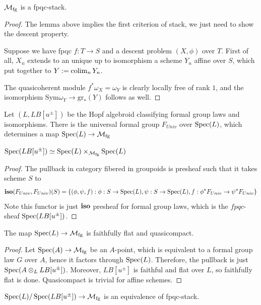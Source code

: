 \begin{proposition}
    $\mathcal{M}_{\mathrm{fg}}$ is a fpqc-stack.
\end{proposition}
\begin{proof}
    The lemma above implies the first criterion of stack, we just need to show the descent property. 

    Suppose we have fpqc $f:T\to S$ and a descent problem $(X, \phi)$ over $T$. First of all, $X_n$ extends to an unique up to isomorphism a scheme $Y_n$ affine over $S$, which put together to $Y:=\operatorname{colim}_n Y_n$. 

    The quasicoherent module $f^*\omega_X=\omega_Y$ is clearly locally free of rank $1$, and the isomorphism $\mathrm{Sym}\omega_Y\to \mathrm{gr}_*(Y)$ follows as well.
\end{proof}

Let $(L, LB[u^{\pm}])$ be the Hopf algebroid classifying formal group laws and isomorphisms. There is the universal formal group $F_{Univ}$ over $\operatorname{\mathrm{Spec}}(L)$, which determines a map $\operatorname{\mathrm{Spec}}(L)\to \mathcal{M}_{\mathrm{fg}}$

\begin{lemma}
    $\operatorname{\mathrm{Spec}}(LB[u^{\pm}])\simeq \operatorname{\mathrm{Spec}}(L)\times_{\mathcal{M}_{\mathrm{fg}}} \operatorname{\mathrm{Spec}}(L)$
\end{lemma}
\begin{proof}
    The pullback in category fibered in groupoids is presheaf such that it takes scheme $S$ to
     \[
    \operatorname{\mathbf{iso}}(F_{Univ}, F_{Univ})(S)=\{(\phi, \psi, f): \phi: S\to \operatorname{\mathrm{Spec}}(L), \psi: S\to \operatorname{\mathrm{Spec}}(L), f:\phi^*F_{Univ}\to \psi^*F_{Univ}\}
    \]
    Note this functor is just $\operatorname{\mathbf{iso}}$ presheaf for formal group laws, which is the $fpqc$-sheaf $\operatorname{\mathrm{Spec}}(LB[u^{\pm}])$.
\end{proof}
\begin{lemma}
    The map $\operatorname{\mathrm{Spec}}(L)\to \mathcal{M}_{\mathrm{fg}}$ is faithfully flat and quasicompact.
\end{lemma}
\begin{proof}
    Let $\operatorname{\mathrm{Spec}}(A)\to \mathcal{M}_{\mathrm{fg}}$ be an $A$-point, which is equivalent to a formal group law $G$ over $A$, hence it factors through $\operatorname{\mathrm{Spec}}(L)$. Therefore, the pullback is just $\operatorname{\mathrm{Spec}}(A \otimes_L LB[u^{\pm}])$. Moreover, $LB[u^{\pm}]$ is faithful and flat over $L$, so faithfully flat is done. Quasicompact is trivial for affine schemes.
\end{proof}

\begin{proposition}
    $\operatorname{\mathrm{Spec}}(L)/\operatorname{\mathrm{Spec}}(LB[u^{\pm}])\to \mathcal{M}_{\mathrm{fg}}$ is an equivalence of fpqc-stack.
\end{proposition}